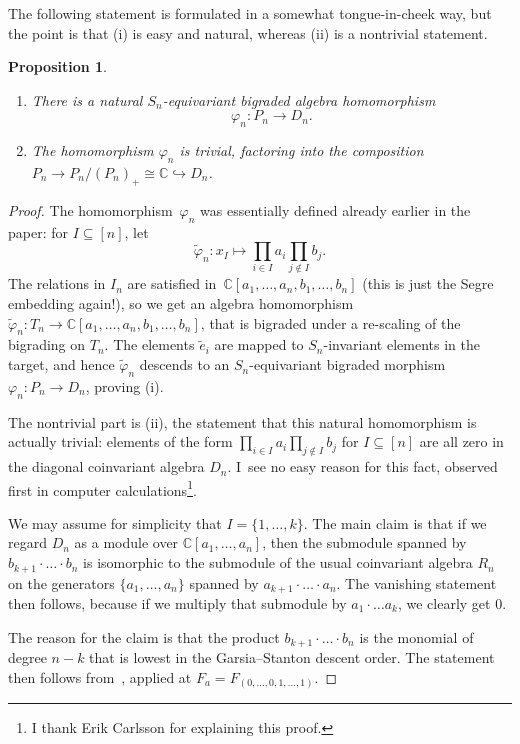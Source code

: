 \documentclass[a4paper,11pt]{amsart}
\theoremstyle{plain}
\newtheorem{proposition}[theorem]{Proposition}
\theoremstyle{definition}
\newcommand{\C}{\mathbb{C}}
\newcommand{\pa}{T} %
\newcommand{\te}{\widetilde{e}}
\begin{document}
The following statement is formulated in a somewhat tongue-in-cheek way, but the point is that (i) is easy and natural, whereas (ii) is a nontrivial statement. 

\begin{proposition} \label{prop:PnDn}
\begin{enumerate}
\item[(i)] There is a natural $S_n$-equivariant bigraded algebra homomorphism \[\varphi_n\colon P_n\to D_n.\] 
\item[(ii)] The homomorphism $\varphi_n$ is trivial, factoring into the composition $P_n\to P_n/(P_n)_+\cong\C\hookrightarrow D_n$. 
\end{enumerate}
\end{proposition}
\begin{proof} The homomorphism~$\varphi_n$ was essentially defined already earlier in the paper: for $I\subseteq [n]$, let  
\[\tilde\varphi_n\colon x_{\scriptscriptstyle I} \mapsto \prod_{i\in I} a_i\prod_{j\not\in I}b_j. 
\]
The relations in $I_n$ are satisfied in~$\C[a_1, \ldots, a_n, b_1, \ldots, b_n]$ (this is just the Segre embedding again!), so we get an algebra homomorphism $\widetilde{\varphi}_n\colon \pa_n\to \C[a_1, \ldots, a_n, b_1, \ldots, b_n]$, that is bigraded under a re-scaling of the bigrading on $T_n$. The elements $\te_i$ are mapped to $S_n$-invariant elements in the target, and hence $\widetilde{\varphi}_n$ descends to an $S_n$-equivariant bigraded morphism $\varphi_n\colon P_n\to D_n$, proving (i). 

The nontrivial part is (ii), the statement that this natural homomorphism is actually trivial: elements of the form $\prod_{i\in I} a_i\prod_{j\not\in I}b_j$ for $I\subseteq [n]$ are all zero in the diagonal coinvariant algebra $D_n$. I~see no easy reason for this fact, observed first in computer calculations\footnote{I thank Erik Carlsson for explaining this proof.}. 

We may assume for simplicity that $I=\{1,\ldots,k\}$. The main claim is that if we regard $D_n$ as a module over $\C[a_1,\ldots,a_n]$, then the submodule spanned by $b_{k+1}\cdot\ldots\cdot b_n$ is isomorphic to the submodule of the usual coinvariant algebra $R_n$ on the generators $\{a_1, \ldots, a_n\}$ spanned by $a_{k+1}\cdot\ldots\cdot a_{n}$. The vanishing statement then follows, because if we multiply that submodule by $a_1\cdot\ldots a_k$, we clearly get $0$.

The reason for the claim is that the product $b_{k+1}\cdot\ldots\cdot b_{n}$ is the monomial of degree $n-k$ that is lowest in the Garsia--Stanton descent order. The statement then follows from~\cite[Thm. B, c)]{CO}, applied at $F_a=F_{(0,\ldots,0,1,\ldots,1)}$. 
\end{proof}
\end{document}
